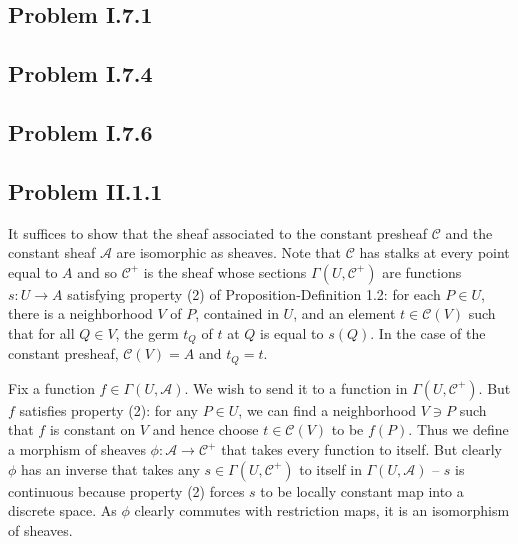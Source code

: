 \documentclass{mathnotes}
\begin{document}
\subsection*{Problem I.7.1}

\subsection*{Problem I.7.4}

\subsection*{Problem I.7.6}

\subsection*{Problem II.1.1}
It suffices to show that the sheaf associated to the constant presheaf $\mathcal{C}$ and the constant sheaf $\mathcal{A}$
are isomorphic as sheaves. Note that $\mathcal{C}$ has stalks at every point equal to $A$ and so $\mathcal{C}^+$ is the sheaf
whose sections $\Gamma(U,\mathcal{C}^+)$ are functions $s:U\to A$ satisfying property (2) of Proposition-Definition 1.2:
for each $P\in U$, there is a neighborhood $V$ of $P$, contained in $U$, and an element $t\in\mathcal{C}(V)$ such that for
all $Q\in V$, the germ $t_Q$ of $t$ at $Q$ is equal to $s(Q)$. In the case of the constant presheaf, $\mathcal{C}(V)=A$ and
$t_Q=t$.

Fix a function $f\in\Gamma(U,\mathcal{A})$. We wish to send it to a function in $\Gamma(U,\mathcal{C}^+)$. But $f$ satisfies
property (2): for any $P\in U$, we can find a neighborhood $V\ni P$ such that $f$ is constant on $V$ and hence choose
$t\in\mathcal{C}(V)$ to be $f(P)$. Thus we define a morphism of sheaves $\phi:\mathcal{A}\to\mathcal{C}^+$ that takes every
function to itself. But clearly $\phi$ has an inverse that takes any $s\in\Gamma(U,\mathcal{C}^+)$ to itself in
$\Gamma(U,\mathcal{A})$ -- $s$ is continuous because property (2) forces $s$ to be locally constant map into a discrete
space. As $\phi$ clearly commutes with restriction maps, it is an isomorphism of sheaves.
\end{document}
